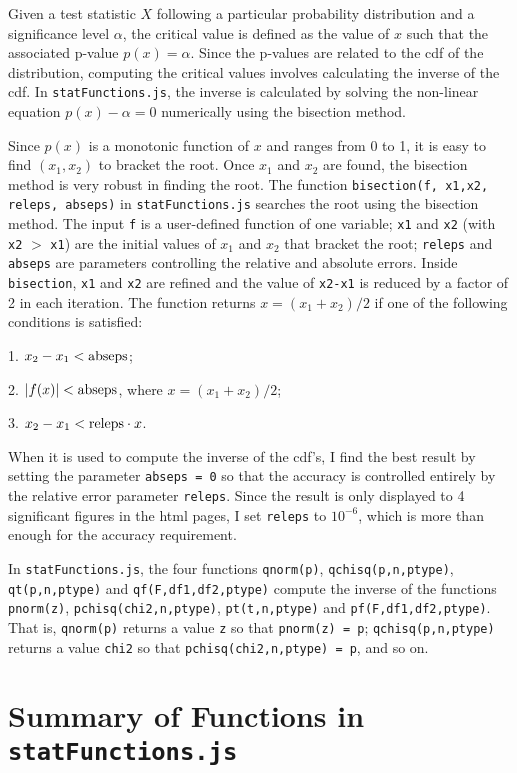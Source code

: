 \documentclass[12pt]{article}
\begin{document}
Given a test statistic $X$ following a particular probability 
distribution and a significance level $\alpha$, the critical value 
is defined as the value of $x$ such that the associated p-value $p(x)=\alpha$. 
Since the p-values are related to the cdf of the distribution, 
computing the critical values involves calculating the inverse of 
the cdf. In {\tt statFunctions.js}, the inverse is calculated by solving the 
non-linear equation $p(x)-\alpha=0$ numerically using the bisection method.

Since $p(x)$ is a monotonic function of $x$ and ranges from 0 to 1, 
it is easy to find $(x_1,x_2)$ to bracket the root. Once $x_1$ and 
$x_2$ are found, the bisection method is very robust in finding 
the root. The function {\tt bisection(f, x1,x2, releps, abseps)} 
in {\tt statFunctions.js} searches the root using the bisection method. 
The input {\tt f} is a user-defined function of one variable; {\tt x1} 
and {\tt x2} (with {\tt x2} $>$ {\tt x1}) are the initial values of 
$x_1$ and $x_2$ that bracket the root; {\tt releps} and {\tt abseps} 
are parameters controlling the relative and absolute errors. 
Inside {\tt bisection}, 
{\tt x1} and {\tt x2} are refined and the value of 
{\tt x2-x1} is reduced by a factor of 2 in each iteration. The function 
returns $x=(x_1+x_2)/2$ if one of the following conditions 
is satisfied: 

1. $x_2-x_1 < {\rm abseps}$;

2. $|f(x)|< {\rm abseps}$, where $x=(x_1+x_2)/2$;

3. $x_2-x_1 < {\rm releps} \cdot x$. 

When it is used to compute the inverse of the cdf's, I find the best result 
by setting the parameter {\tt abseps = 0} so that the 
accuracy is controlled entirely by the relative error parameter {\tt releps}. 
Since the result is only displayed to 4 significant figures in the 
html pages, I set {\tt releps} 
to $10^{-6}$, which is more than enough for the accuracy requirement.

In {\tt statFunctions.js}, the four functions {\tt qnorm(p)}, {\tt qchisq(p,n,ptype)}, 
{\tt qt(p,n,ptype)} and {\tt qf(F,df1,df2,ptype)} compute the inverse of 
the functions {\tt pnorm(z)}, {\tt pchisq(chi2,n,ptype)}, {\tt pt(t,n,ptype)} 
and {\tt pf(F,df1,df2,ptype)}. That is, {\tt qnorm(p)} returns a value {\tt z} so that 
{\tt pnorm(z) = p}; {\tt qchisq(p,n,ptype)} returns a value {\tt chi2} so that 
{\tt pchisq(chi2,n,ptype) = p}, and so on.

\section{Summary of Functions in {\tt statFunctions.js}}
\end{document}
